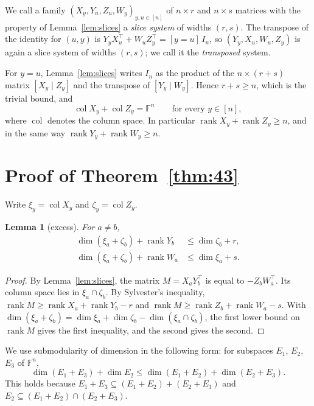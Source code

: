 \documentclass[11pt]{amsart}
\newtheorem{lemma}[theorem]{Lemma}
\theoremstyle{remark}
\newcommand{\F}{\mathbb{F}}
\newcommand{\rk}{\operatorname{rank}}
\newcommand{\col}{\operatorname{col}}
\begin{document}
We call a family $(X_y,Y_u,Z_u,W_y)_{y,u\in[n]}$ of $n\times r$ and $n\times s$ matrices with the property of
Lemma~\ref{lem:slices} a \emph{slice system} of widths $(r,s)$. The transpose of the identity for $(u,y)$ is
$Y_yX_u^{\top}+W_uZ_y^{\top}=[y=u]\,I_n$, so $(Y_y,X_u,W_u,Z_y)$ is again a slice system of widths $(r,s)$;
we call it the \emph{transposed} system.

For $y=u$, Lemma~\ref{lem:slices} writes $I_n$ as the product of the $n\times(r+s)$ matrix $[X_y\mid Z_y]$
and the transpose of $[Y_y\mid W_y]$. Hence $r+s\ge n$, which is the trivial bound, and
\begin{equation}\label{eq:span}
  \col X_y+\col Z_y=\F^n\qquad\text{for every }y\in[n],
\end{equation}
where $\col$ denotes the column space. In particular $\rk X_y+\rk Z_y\ge n$, and in the same way
$\rk Y_y+\rk W_y\ge n$.

\section{Proof of Theorem~\ref{thm:43}}\label{sec:43}

Write $\xi_y=\col X_y$ and $\zeta_y=\col Z_y$.

\begin{lemma}[excess]\label{lem:excess}
For $a\ne b$,
\begin{align*}
  \dim(\xi_a+\zeta_b)+\rk Y_b&\le\dim\zeta_b+r,\\
  \dim(\xi_a+\zeta_b)+\rk W_a&\le\dim\xi_a+s.
\end{align*}
\end{lemma}

\begin{proof}
By Lemma~\ref{lem:slices}, the matrix $M=X_aY_b^{\top}$ is equal to $-Z_bW_a^{\top}$. Its column space lies
in $\xi_a\cap\zeta_b$. By Sylvester's inequality, $\rk M\ge\rk X_a+\rk Y_b-r$ and $\rk M\ge\rk Z_b+\rk W_a-s$.
With $\dim(\xi_a+\zeta_b)=\dim\xi_a+\dim\zeta_b-\dim(\xi_a\cap\zeta_b)$, the first lower bound on $\rk M$ gives
the first inequality, and the second gives the second.
\end{proof}

We use submodularity of dimension in the following form: for subspaces $E_1$, $E_2$, $E_3$ of $\F^n$,
\begin{equation}\label{eq:submod}
  \dim(E_1+E_3)+\dim E_2\le\dim(E_1+E_2)+\dim(E_2+E_3).
\end{equation}
This holds because $E_1+E_3\subseteq(E_1+E_2)+(E_2+E_3)$ and $E_2\subseteq(E_1+E_2)\cap(E_2+E_3)$.
\end{document}

